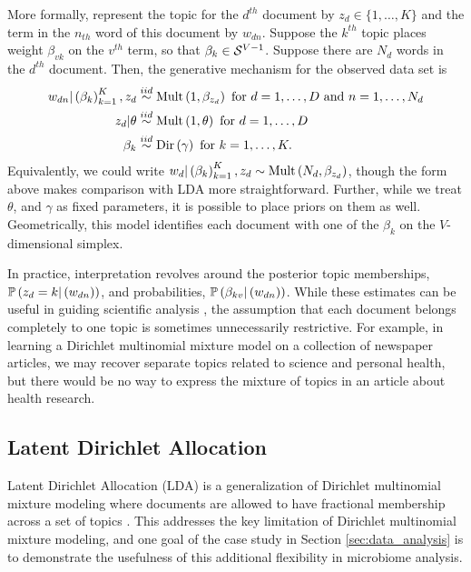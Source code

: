 \documentclass[oupdraft]{bio}
\begin{document}
More formally, represent the topic for the $d^{th}$ document by $z_{d} \in \{1,
\dots, K\}$ and the term in the $n_{th}$ word of this document by $w_{dn}$.
Suppose the $k^{th}$ topic places weight $\beta_{vk}$ on the $v^{th}$ term, so
that $\beta_{k} \in \mathcal{S}^{V - 1}$. Suppose there are $N_{d}$ words in the
$d^{th}$ document. Then, the generative mechanism for the observed data set is
\begin{align*}
  w_{dn} \vert \left(\beta_{k}\right)_{k = 1}^{K}, z_{d} &\overset{iid}{\sim}\textnormal{Mult}\left(1, \beta_{z_{d}}\right) \text{ for } d = 1, \dots, D \text{ and } n = 1, \dots, N_{d} \\
  z_{d} \vert \theta &\overset{iid}{\sim} \textnormal{Mult}\left(1, \theta\right) \text{ for } d = 1, \dots, D \\
  \beta_{k} &\overset{iid}{\sim} \textnormal{Dir}\left(\gamma\right) \text{ for } k = 1, \dots, K.
\end{align*}
Equivalently, we could write $w_{d} \vert \left(\beta_{k}\right)_{k = 1}^{K},
z_{d} \sim \textnormal{Mult}\left(N_{d}, \beta_{z_{d}}\right)$, though the form above makes
comparison with LDA more straightforward. Further, while we treat $\theta$, and
$\gamma$ as fixed parameters, it is possible to place priors on them as well.
Geometrically, this model identifies each document with one of the $\beta_{k}$ on
the $V$-dimensional simplex.

In practice, interpretation revolves around the posterior topic memberships,
$\mathbb{P}\left({z_{d} = k \vert \left(w_{dn}\right)}\right)$, and probabilities,
$\mathbb{P}\left({\beta_{kv}\vert \left(w_{dn}\right)}\right)$. While these
estimates can be useful in guiding scientific analysis \citep{nigam2000text,
  holmes2012dirichlet}, the assumption that each document belongs completely to
one topic is sometimes unnecessarily restrictive. For example, in learning a
Dirichlet multinomial mixture model on a collection of newspaper articles, we
may recover separate topics related to science and personal health, but there
would be no way to express the mixture of topics in an article about health
research.

\subsection{Latent Dirichlet Allocation}

Latent Dirichlet Allocation (LDA) is a generalization of Dirichlet multinomial
mixture modeling where documents are allowed to have fractional membership
across a set of topics \citep{blei2003latent}. This addresses the key limitation
of Dirichlet multinomial mixture modeling, and one goal of the case study in
Section \ref{sec:data_analysis} is to demonstrate the usefulness of this
additional flexibility in microbiome analysis.
\end{document}
